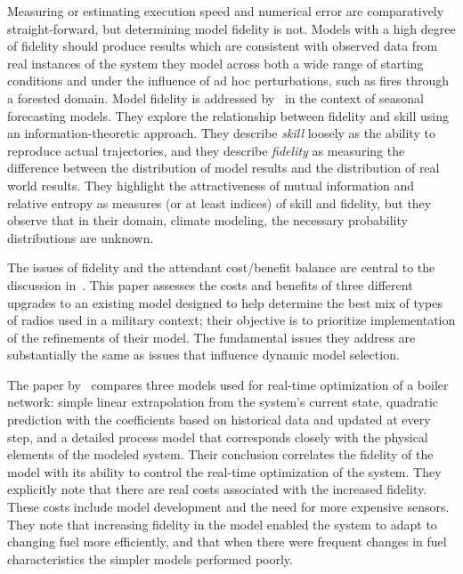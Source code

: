 Measuring or estimating execution speed and numerical error are
comparatively straight-forward, but determining model fidelity is not.
Models with a high degree of fidelity should produce results which are
consistent with observed data from real instances of the system they
model across both a wide range of starting conditions and under the
influence of ad hoc perturbations, such as fires through a forested
domain. Model fidelity is addressed by~\cite{delsole2010model} in the
context of seasonal forecasting models. They explore the relationship
between fidelity and skill using an information-theoretic approach.
They describe \emph{skill} loosely as the ability to reproduce actual
trajectories, and they describe \emph{fidelity} as measuring the
difference between the distribution of model results and the
distribution of real world results.  They highlight the attractiveness
of mutual information and relative entropy as measures (or at least
indices) of skill and fidelity, but they observe that in their domain,
climate modeling, the necessary probability distributions are unknown.

The issues of fidelity and the attendant cost/benefit balance are
central to the dis\-cus\-sion in~\cite{bailey1992scientific}.  This paper
assesses the costs and benefits of three dif\-fer\-ent upgrades to an
existing model designed to help de\-ter\-mine the best mix of types of
radios used in a mil\-i\-tary con\-text; their ob\-jec\-tive is to prioritize
im\-ple\-men\-ta\-tion of the refinements of their model. The fun\-da\-men\-tal
issues they address are substantially the same as issues that
in\-flu\-ence dynamic model selection.

The paper by~\cite{yip2004effect} compares three models used for
real-time optimization of a boiler network: simple linear
extrapolation from the system's current state, quadratic prediction
with the coefficients based on historical data and updated at every
step, and a detailed process model that corresponds closely with the
physical elements of the modeled system. Their conclusion correlates
the fidelity of the model with its ability to control the real-time
optimization of the system. They explicitly note that there are real
costs associated with the increased fidelity. These costs include
model development and the need for more expensive sensors. They note
that increasing fidelity in the model enabled the system to adapt to
changing fuel more efficiently, and that when there were frequent
changes in fuel characteristics the simpler models performed poorly.

